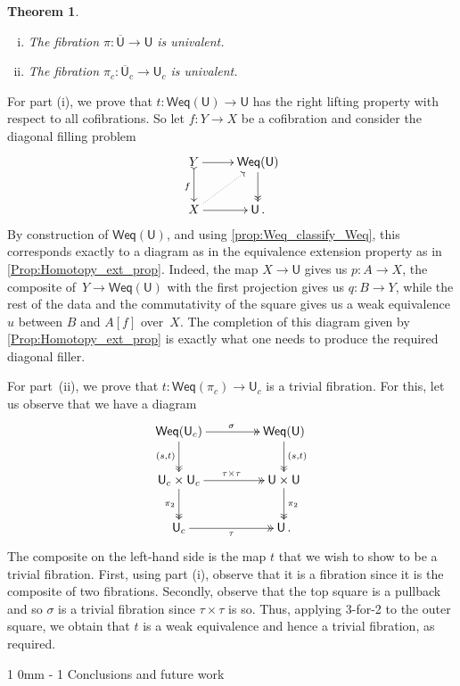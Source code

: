 \documentclass[reqno,10pt,a4paper,oneside,draft]{amsart}
\makeatletter
\renewenvironment{proof}[1][\proofname] {\par\pushQED{\qed}\normalfont\topsep6\p@\@plus6\p@\relax\trivlist\item[\hskip\labelsep\bf#1\@addpunct{.}]\ignorespaces}{\popQED\endtrivlist\@endpefalse}
\renewcommand{\section}{\@startsection
{section}%
{1}%
{0mm}%
{-\baselineskip}%
{1\baselineskip}%
{\Large \bfseries}}%
\numberwithin{equation}{section}
\theoremstyle{mythm}
\newtheorem{theorem}{Theorem}[section]
\theoremstyle{mydef}
\theoremstyle{myrmk}
\newcommand{\co}{\colon}
\newcommand{\UU}{\overline{\mathsf{U}}}
\newcommand{\U}{\mathsf{U}}
\newcommand{\Weq}{\mathsf{Weq}}
\makeatother
\begin{document}
\begin{theorem}  \label{thm:univalence-of-u-and-uc} \hfill 
\begin{enumerate}[(i)]
\item The fibration $\pi \co \UU \to \U$ is univalent.
\item The fibration $\pi_c \co \UU_c \to \U_c$ is univalent.
\end{enumerate}
\end{theorem}

\begin{proof} For part (i), we prove that $t \co  \Weq(\U) \to \U$ has the right lifting property with respect
to all cofibrations. So let $f \co Y \rightarrow X$ be a cofibration and consider the diagonal
filling problem
\[
\xymatrix{Y \ar@{>->}[d]_f \ar[r] & \Weq(\U) \ar@{->>}[d] \\
X \ar[r] \ar@{.>}[ur]  & \U \, .
}
\]
By construction of $\Weq(\U)$, and using \cref{prop:Weq_classify_Weq}, this corresponds exactly to a diagram as in the equivalence extension property as in \cref{Prop:Homotopy_ext_prop}. Indeed, the map $X \rightarrow \U$ gives us
$p \co A \to X$, the composite of~$Y \rightarrow  \mathsf{Weq}(\U)$ with the first projection
gives us $q \co B \to Y$, while the rest of the data and the commutativity of the square 
gives us a weak equivalence $u$ between $B$ and $A[f]$ over~$X$. The completion of this diagram given by \cref{Prop:Homotopy_ext_prop} is exactly what one needs to produce the required diagonal filler.

For part~(ii), we prove that $t \co \Weq(\pi_c) \to \U_c$ is a trivial fibration. For this, let us
observe that we have a diagram 
\[
\xymatrix@C=1.5cm{
\Weq(\U_c) \ar@{->>}[r]^{\sigma}  \ar@{->>}[d]_{(s,t)} & \Weq(\U) \ar@{->>}[d]^{(s,t)} \\
\U_c \times \U_c \ar@{->>}[r]^{\tau \times \tau} \ar@{->>}[d]_{\pi_2} & \U \times \U \ar@{->>}[d]^{\pi_2} \\
\U_c \ar@{->>}[r]_\tau & \U \, . }
\]
The composite  on the left-hand side is the map $t$ that we wish to show to be a trivial fibration.
First, using part (i), observe that it is a fibration since it is the composite of two fibrations. Secondly,
observe that the top square is a pullback and so $\sigma$ is a trivial fibration since $\tau \times \tau$ 
is so. Thus, applying 3-for-2 to the outer square, we obtain that $t$ is a weak equivalence and hence
a trivial fibration, as required.
\end{proof} 


\section{Conclusions and future work}
\label{sec:conclusion}
\end{document}
